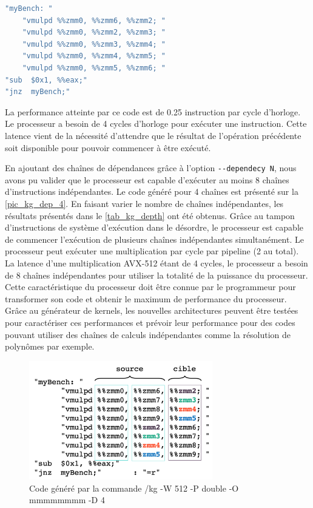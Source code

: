     
\begin{lstlisting}[label=lst_dep1,language=C, caption=Code généré par la commande /kg -W 512 -P double -O mmmmm -D 1]
"myBench: " 
	"vmulpd %%zmm0, %%zmm6, %%zmm2; "
	"vmulpd %%zmm0, %%zmm2, %%zmm3; "
	"vmulpd %%zmm0, %%zmm3, %%zmm4; "
	"vmulpd %%zmm0, %%zmm4, %%zmm5; "
	"vmulpd %%zmm0, %%zmm5, %%zmm6; "
"sub  $0x1, %%eax;"
"jnz  myBench;"
\end{lstlisting}

    La performance atteinte par ce code est de 0.25 instruction par cycle d'horloge. Le processeur a besoin de 4 cycles d'horloge pour exécuter une instruction. Cette latence vient de la nécessité d'attendre que le résultat de l'opération précédente soit disponible pour pouvoir commencer à être exécuté. 
    
    En ajoutant des chaînes de dépendances grâce à l'option \verb|--dependecy N|, nous avons pu valider que le processeur est capable d'exécuter au moins 8 chaînes d'instructions indépendantes. Le code généré pour 4 chaînes est présenté sur la \autoref{pic_kg_dep_4}. En faisant varier le nombre de chaînes indépendantes, les résultats présentés dans le \autoref{tab_kg_depth} ont été obtenus. Grâce au tampon d'instructions de système d'exécution dans le désordre, le processeur est capable de commencer l'exécution de plusieurs chaînes indépendantes simultanément. Le processeur peut exécuter une multiplication par cycle par pipeline (2 au total). La latence d'une multiplication AVX-512 étant de 4 cycles, le processeur a besoin de 8 chaînes indépendantes pour utiliser la totalité de la puissance du processeur. Cette caractéristique du processeur doit être connue par le programmeur pour transformer son code et obtenir le maximum de performance du processeur. Grâce au générateur de kernels, les nouvelles architectures peuvent être testées pour caractériser ces performances et prévoir leur performance pour des codes pouvant utiliser des chaînes de calculs indépendantes comme la résolution de polynômes par exemple. 
    
         \begin{figure}
            \center
            \includegraphics[width=8cm]{images/kg_dep_4.png}
            \caption{\label{pic_kg_dep_4} Code généré par la commande /kg -W 512 -P double -O mmmmmmmm -D 4}
        \end{figure}

